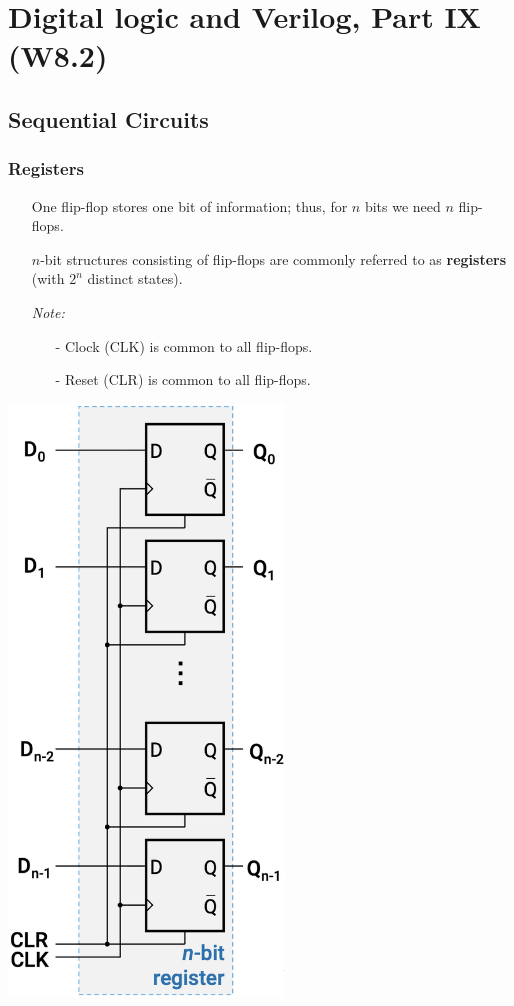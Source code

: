 \documentclass[12pt,openany]{book}
\begin{document}
\chapter{Digital logic and Verilog, Part IX (W8.2)}
\section{Sequential Circuits}
\subsection{Registers}

\begin{minipage}{0.4\textwidth}
	\small
\begin{itemize}
    \item[] One flip-flop stores one bit of information; thus, for \(n\) bits we need \(n\) flip-flops.
    \item[] \(n\)-bit structures consisting of flip-flops are commonly referred to as \textbf{registers} (with \(2^{n}\) distinct states).
    \item[] \textit{Note:}
    \begin{itemize}
        \item[-] Clock (CLK) is common to all flip-flops.
        \item[-] Reset (CLR) is common to all flip-flops.
    \end{itemize}
\end{itemize}
\end{minipage}
\hfill
\vline
\hfill
\begin{minipage}{0.5\textwidth}
\begin{center}	    
	\includegraphics[width=0.55\textwidth]{circuits/14.1.1.png}
	\footnotesize
\end{center}
\end{minipage}
\end{document}
